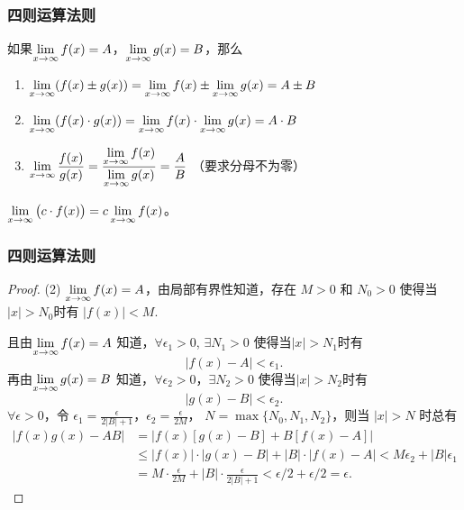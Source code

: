 \documentclass[14pt,notheorems,leqno,xcolor={rgb}]{beamer} %
\begin{document}
\begin{frame}
\frametitle{四则运算法则}
\begin{theorem}
如果$\lim\limits_{x\to\infty}f(x)=A$，$\lim\limits_{x\to\infty}g(x)=B$，那么
\begin{enumerate}
  \item $\lim\limits_{x\to\infty}(f(x) \pm g(x)) = \lim\limits_{x\to\infty}f(x) \pm \lim\limits_{x\to\infty}g(x) = A \pm B$
  \item $\lim\limits_{x\to\infty}(f(x) \cdot g(x)) = \lim\limits_{x\to\infty}f(x) \cdot \lim\limits_{x\to\infty}g(x) = A \cdot B$
  \item $\lim\limits_{x\to\infty}\dfrac{f(x)}{g(x)} = \dfrac{\lim\limits_{x\to\infty}f(x)}{\lim\limits_{x\to\infty}g(x)} = \dfrac{A}{B}$ 
       （要求分母不为零）
\end{enumerate}
\end{theorem}
\vpause
\begin{corollary*}
$\lim\limits_{x\to\infty}\big(c\cdot f(x)\big) = c \lim\limits_{x\to\infty}f(x)$。
\end{corollary*}
\end{frame}

\begin{jframe}[plain]
\frametitle{四则运算法则 \optstar}
\footnotesize
\begin{proof}
(2) $\lim\limits_{x\to\infty}f(x)=A$，由局部有界性知道，存在 $M>0$ 和 $N_0>0$ 使得当$|x|>N_0$时有
$ |f(x)|<M$.\par
且由$\lim\limits_{x\to\infty}f(x)=A$ 知道，$\forall\epsilon_1>0$, $\exists N_1>0$ 使得当$|x|>N_1$时有
\[ |f(x)-A|<\epsilon_1. \]
再由$\lim\limits_{x\to\infty}g(x)=B$ 知道，$\forall\epsilon_2>0$，$\exists N_2>0$ 使得当$|x|>N_2$时有
\[ |g(x)-B|<\epsilon_2. \]
$\forall\epsilon>0$，令 $\epsilon_1=\frac{\epsilon}{2|B|+1}$，$\epsilon_2=\frac{\epsilon}{2M}$，
$N=\max\{N_0,N_1,N_2\}$，则当 $|x|>N$ 时总有
\begin{align*}
|f(x)g(x)-AB|&=\big|f(x)[g(x)-B]+B[f(x)-A]\big| \\
             &\le |f(x)|\cdot|g(x)-B|+|B|\cdot|f(x)-A|<M\epsilon_2+|B|\epsilon_1\\
             &=M\cdot\frac{\epsilon}{2M}+|B|\cdot\frac{\epsilon}{2|B|+1}<\epsilon/2+\epsilon/2=\epsilon.
\end{align*}%
\end{proof}
\end{jframe}
\end{document}
